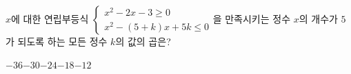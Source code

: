 \hspace*{2mm}\begin{minipage}[t]{\dimexpr\linewidth-2mm\relax}\vspace{0pt}
$x$에 대한 연립부등식 $\begin{cases} x^2-2x-3\ge 0 \\ x^2-(5+k)x+5k\le 0 \end{cases}$을 만족시키는 정수 $x$의 개수가 $5$가 되도록 하는 모든 정수 $k$의 값의 곱은?
\begin{choices32}{$-36$}{$-30$}{$-24$}{$-18$}{$-12$}\end{choices32}\end{minipage}
